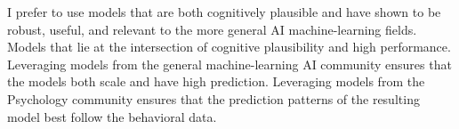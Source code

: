 I prefer to use models that are both cognitively plausible and have shown to be robust, useful, and relevant to the more general AI machine-learning fields.
Models that lie at the intersection of cognitive plausibility and high performance.
Leveraging models from the general machine-learning AI community ensures that the models both scale and have high prediction.
Leveraging models from the Psychology community ensures that the prediction patterns of the resulting model best follow the behavioral data.
